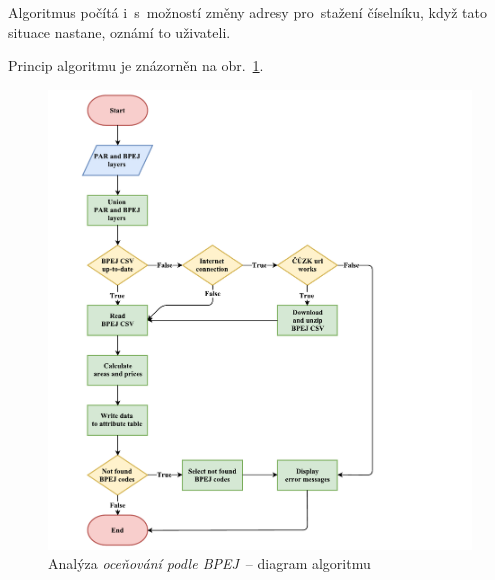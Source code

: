Algoritmus počítá i~s~možností změny adresy pro~stažení číselníku, když tato situace nastane, oznámí to uživateli.

Princip algoritmu je znázorněn na obr.~\ref{fig:diagram_bpej}.

	\begin{figure}[H]
		\includegraphics[width=1.2\textwidth]{./pictures/bpej.pdf}
		\caption[Analýza \textit{oceňování podle BPEJ}~– diagram algoritmu]{Analýza \textit{oceňování podle BPEJ}~– diagram algoritmu}
		\label{fig:diagram_bpej}
 	\end{figure}
